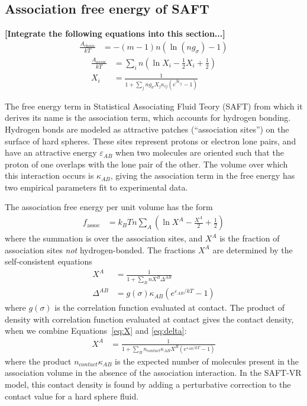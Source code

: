 \documentclass[letterpaper,twocolumn,amsmath,amssymb,jcp,10pt,aip]{revtex4-1}
\newcommand{\red}[1]{{\bf \color{red} #1}}
\newcommand{\fixme}[1]{\red{[#1]}}
\begin{document}
\subsection{Association free energy of SAFT}

\fixme{Integrate the following equations into this section...}
\begin{align}
  \frac{A_\textit{chain}}{kT} &= -(m-1) n \left(\ln\left(n g_\sigma \right)-1\right)
\end{align}
\begin{align}
  \frac{A_\textit{assoc}}{kT} &= \sum_i n \left(\ln X_i - \frac12 X_i + \frac12\right) \\
  X_i &= \frac{1}{1 + \sum_j n g_\sigma X_j\kappa_{ij} \left(e^{\beta \epsilon_{ij}}-1\right)}
\end{align}

\newcommand\epsilonassoc{\ensuremath{\varepsilon_\textit{AB}}}
\newcommand\kappaassoc{\ensuremath{\kappa_\textit{AB}}}
\newcommand\ncontact{\ensuremath{n_\textit{contact}}}

The free energy term in Statistical Associating Fluid Teory (SAFT)
from which it derives its name is the association term, which accounts
for hydrogen bonding.  Hydrogen bonds are modeled as attractive
patches (``association sites'') on the surface of hard spheres.  These
sites represent protons or electron lone pairs, and have an attractive
energy $\epsilonassoc$ when two molecules are oriented such that the
proton of one overlaps with the lone pair of the other.  The volume
over which this interaction occurs is $\kappaassoc$, giving the
association term in the free energy has two empirical parameters fit
to experimental data.

The association free energy per unit volume has the form
\begin{align}
  f_\text{assoc} &= k_BT n\sum_A 
                  \left(\ln X^A - \frac{X^A}{2} + \frac12\right)
\end{align}
where the summation is over the association sites, and $X^A$ is the
fraction of association sites \emph{not} hydrogen-bonded.  The
fractions $X^A$ are determined by the self-consistent equations
\begin{align}
  X^A &= \frac{1}
  {1 + \sum_B n X^B \Delta^{AB}}\label{eq:X}
  \\
  \Delta^{AB} &= g(\sigma) \kappaassoc\left( e^{\epsilonassoc/kT} -
  1 \right)\label{eq:delta}
\end{align}
where $g(\sigma)$ is the correlation function evaluated at contact.
The product of density with correlation function evaluated at contact
gives the contact density, when we combine Equations~\ref{eq:X} and
\ref{eq:delta}:
\begin{align}
  X^A &= \frac{1}
  {1 + \sum_B \ncontact\kappaassoc X^B\left( e^{\epsilonassoc/kT} -
  1 \right)}
\end{align}
where the product $\ncontact\kappaassoc$ is the expected number of
molecules present in the association volume in the absence of the
association interaction.  In the SAFT-VR
model\cite{gil-villegas-1997-SAFT-VR}, this contact density is found
by adding a perturbative correction to the contact value for a hard
sphere fluid.
\end{document}
